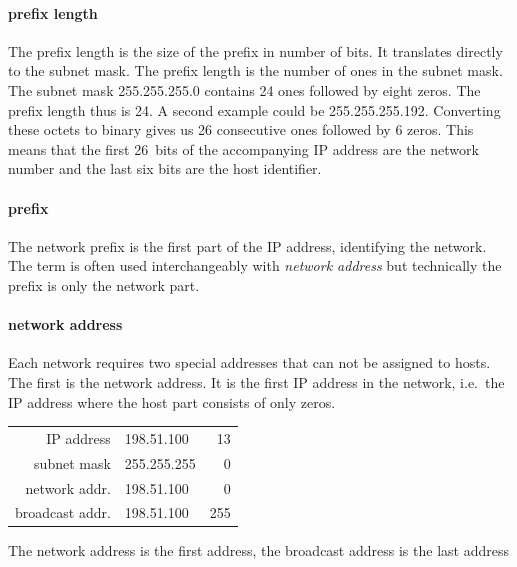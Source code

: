 \paragraph{prefix length}
The prefix length is the size of the prefix in number of bits.
It translates directly to the subnet mask.
The prefix length is the number of ones in the subnet mask.
The subnet mask 255.255.255.0 contains 24 ones followed by eight zeros.
The prefix length thus is 24.
A second example could be 255.255.255.192.
Converting these octets to binary gives us 26 consecutive ones followed by 6 zeros.
This means that the first 26~bits of the accompanying \acs{IP} address are the network number and the last six bits are the host identifier.

\paragraph{prefix}
The network prefix is the first part of the \acs{IP} address, identifying the network.
The term is often used interchangeably with \emph{network address} but technically the prefix is only the network part.

\paragraph{network address}
Each network requires two special addresses that can not be assigned to hosts.
The first is the network address.
It is the first \acs{IP} address in the network, i.e.~the \acs{IP} address where the host part consists of only zeros.

\begin{margintable}
\footnotesize
\begin{tabular}{@{}rl@{.}r@{}}
\textcolor{spot5}{\acs{IP} address}  & \textcolor{spot1}{198.51.100}  & 13 \\
\textcolor{spot5}{subnet mask}       & 255.255.255 &  0 \\
\textcolor{spot5}{network addr.}     & \textcolor{spot1}{198.51.100}  & \textcolor{spot2}{0}   \\
\textcolor{spot5}{broadcast addr.}   & \textcolor{spot1}{198.51.100}  & \textcolor{spot2}{255} \\
\end{tabular}
\caption{The network address is the first address, the broadcast address is the last address}
\label{tab:network-broadcast-address}
\end{margintable}

